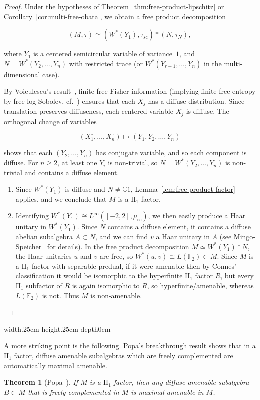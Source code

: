 \documentclass[10pt,a4paper,reqno]{amsart}
\newtheorem{theorem}{Theorem}[section]
\def\qed{ \hfill \vrule width.25cm height.25cm depth0cm\smallskip}
\newcommand{\C}{\mathbb{C}}
\begin{document}
\begin{proof}
Under the hypotheses of Theorem~\ref{thm:free-product-lipschitz} or
Corollary~\ref{cor:multi-free-obata}, we obtain a free product
decomposition


\[
(M,\tau)
\simeq
(W^\ast(Y_1),\tau_{\mathrm{sc}})
*
(N,\tau_N),
\]


where $Y_1$ is a centered semicircular variable of variance~$1$, and
$N=W^\ast(Y_2,\ldots,Y_n)$ with restricted trace (or $W^\ast(Y_{r+1},\ldots,Y_n)$ in the
multi-dimensional case).

By Voiculescu’s result~\cite[Corollary~4.7]{V}, finite free Fisher
information (implying finite free entropy by free log-Sobolev, cf.~\cite[Proposition~7.9]{V}) ensures that
each $X_j$ has a diffuse distribution. Since translation preserves
diffuseness, each centered variable $X_j^\circ$ is diffuse. The
orthogonal change of variables


\[
(X_1^\circ,\ldots,X_n^\circ)\mapsto (Y_1,Y_2,\ldots,Y_n)
\]


shows that each $(Y_2,\ldots,Y_n)$ has conjugate variable, and so each component is diffuse. For $n\ge 2$, at least one $Y_i$ is non-trivial, so
$N=W^\ast(Y_2,\ldots,Y_n)$ is non-trivial and contains a diffuse element.


\smallskip
\begin{enumerate}
\item Since $W^\ast(Y_1)$ is diffuse and $N\neq\C 1$, Lemma~\ref{lem:free-product-factor}
applies, and we conclude that $M$ is a $\mathrm{II}_1$ factor.

\item Identifying $W^*(Y_1)\cong L^\infty([-2,2],\mu_{\mathrm{sc}})$, we then easily produce a Haar unitary in $W^*(Y_1)$.
\newline
Since $N$ contains a diffuse element, it contains a diffuse abelian subalgebra 
$A\subset N$, and we can find $v$ a Haar unitary in $A$ (see Mingo-Speicher~\cite[Theorem~6]{SM} for details).  In the free product decomposition
$M\simeq W^*(Y_1)*N$, the Haar unitaries $u$ and $v$ are free, so
$W^*(u,v)\cong L(\mathbb F_2)\subset M
$. Since $M$ is a $\mathrm{II}_1$ factor with separable predual, if it were amenable then by Connes' classification it would be isomorphic to the hyperfinite $\mathrm{II}_1$ factor $R$, but every $\mathrm{II}_1$ subfactor of $R$ is again isomorphic to $R$, so hyperfinite/amenable, whereas $L(\mathbb F_2)$ is not. Thus $M$ is non-amenable.

\end{enumerate}
\end{proof}
\qed
\begin{flushleft}
A more striking point is the following. Popa’s breakthrough result shows that in a $\mathrm{II}_1$ factor, diffuse amenable subalgebras which are freely complemented are automatically
maximal amenable.
\end{flushleft}
\begin{theorem}[Popa~\cite{Popa}]
If $M$ is a $\mathrm{II}_1$ factor, then any diffuse amenable subalgebra
$B \subset M$ that is freely complemented in $M$ is maximal amenable in $M$.
\end{theorem}
\end{document}
